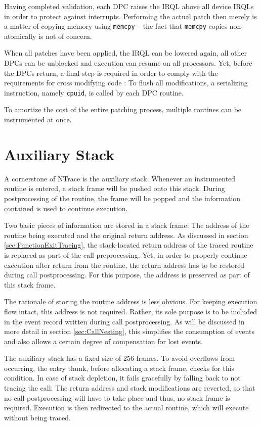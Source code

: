 Having completed validation, each DPC raises the IRQL above all device IRQLs 
in order to protect against interrupts. Performing the actual patch then merely is 
a matter of copying memory using \verb|memcpy| -- the fact that \verb|memcpy| 
copies non-atomically is not of concern. 

When all patches have been applied, the IRQL can be lowered again, all other DPCs can be unblocked and execution
can resume on all processors. Yet, before the DPCs return, a final step is required
in order to comply with the requirements for cross modifying code \cite{intel07_3A}:
To flush all modifications, a serializing instruction, namely \verb|cpuid|, is called by each DPC routine.

To amortize the cost of the entire patching process, multiple routines
can be instrumented at once.
 
\section{Auxiliary Stack}
\label{sec:AuxiliaryStack}

A cornerstone of NTrace is the auxiliary stack. Whenever
an instrumented routine is entered, a stack frame will be pushed onto this stack.
During postprocessing of the routine, the frame will be popped and the information
contained is used to continue execution.

Two basic pieces of information are stored in a stack frame: The address of the routine
being executed and the original return address. As discussed in section 
\ref{sec:FunctionExitTracing}, the stack-located return address of the traced 
routine is replaced as part of the call preprocessing. Yet, 
in order to properly continue execution after return from 
the routine, the return address has to be restored during call postprocessing. For this
purpose, the address is preserved as part of this stack frame. 

The rationale of storing the routine address is less obvious. For keeping execution
flow intact, this address is not required. Rather, its sole purpose is to be included
in the event record written during call postprocessing. As will be discussed in more
detail in section \ref{sec:CallNesting}, this simplifies the consumption of events and
also allows a certain degree of compensation for lost events.

The auxiliary stack has a fixed size of 256 frames. To avoid overflows from
occurring, the entry thunk, before allocating a stack frame, checks for
this condition. In case of stack depletion, it fails gracefully by falling back
to not tracing the call: The return address and stack modifications are reverted,
so that no call postprocessing will have to take place and thus, no stack frame
is required. Execution is then redirected to the actual routine, which will execute
without being traced.

